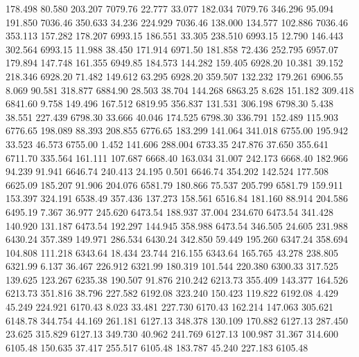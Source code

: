  178.498   80.580  203.207      7079.76
  22.777   33.077  182.034      7079.76
 346.296   95.094  191.850      7036.46
 350.633   34.236  224.929      7036.46
 138.000  134.577  102.886      7036.46
 353.113  157.282  178.207      6993.15
 186.551   33.305  238.510      6993.15
  12.790  146.443  302.564      6993.15
  11.988   38.450  171.914      6971.50
 181.858   72.436  252.795      6957.07
 179.894  147.748  161.355      6949.85
 184.573  144.282  159.405      6928.20
  10.381   39.152  218.346      6928.20
  71.482  149.612   63.295      6928.20
 359.507  132.232  179.261      6906.55
   8.069   90.581  318.877      6884.90
  28.503   38.704  144.268      6863.25
   8.628  151.182  309.418      6841.60
   9.758  149.496  167.512      6819.95
 356.837  131.531  306.198      6798.30
   5.438   38.551  227.439      6798.30
  33.666   40.046  174.525      6798.30
 336.791  152.489  115.903      6776.65
 198.089   88.393  208.855      6776.65
 183.299  141.064  341.018      6755.00
 195.942   33.523   46.573      6755.00
   1.452  141.606  288.004      6733.35
 247.876   37.650  355.641      6711.70
 335.564  161.111  107.687      6668.40
 163.034   31.007  242.173      6668.40
 182.966   94.239   91.941      6646.74
 240.413   24.195    0.501      6646.74
 354.202  142.524  177.508      6625.09
 185.207   91.906  204.076      6581.79
 180.866   75.537  205.799      6581.79
 159.911  153.397  324.191      6538.49
 357.436  137.273  158.561      6516.84
 181.160   88.914  204.586      6495.19
   7.367   36.977  245.620      6473.54
 188.937   37.004  234.670      6473.54
 341.428  140.920  131.187      6473.54
 192.297  144.945  358.988      6473.54
 346.505   24.605  231.988      6430.24
 357.389  149.971  286.534      6430.24
 342.850   59.449  195.260      6347.24
 358.694  104.808  111.218      6343.64
  18.434   23.744  216.155      6343.64
 165.765   43.278  238.805      6321.99
   6.137   36.467  226.912      6321.99
 180.319  101.544  220.380      6300.33
 317.525  139.625  123.267      6235.38
 190.507   91.876  210.242      6213.73
 355.409  143.377  164.526      6213.73
 351.816   38.796  227.582      6192.08
 323.240  150.423  119.822      6192.08
   4.429   45.249  224.921      6170.43
   8.023   33.481  227.730      6170.43
 162.214  147.063  305.621      6148.78
 344.754   44.169  261.181      6127.13
 348.378  130.109  170.882      6127.13
 287.450   23.625  315.829      6127.13
 349.730   40.962  241.769      6127.13
 100.987   31.367  314.600      6105.48
 150.635   37.417  255.517      6105.48
 183.787   45.240  227.183      6105.48
